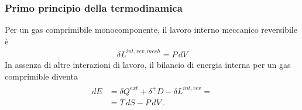 \documentclass[letterpaper,10pt,italian]{jupyterBook}
\begin{document}
\subsubsection{Primo principio della termodinamica}
\label{\detokenize{ch/thermodynamics/ideal-gas-formulas:primo-principio-della-termodinamica}}
\sphinxAtStartPar
Per un gas comprimibile monocomponente, il lavoro interno meccanico reversibile è
\begin{equation*}
\begin{split}\delta L^{int,rev, mech} = P \, d V\end{split}
\end{equation*}
\sphinxAtStartPar
In assenza di altre interazioni di lavoro, il bilancio di energia interna per un gas comprimible diventa
\begin{equation*}
\begin{split}\begin{aligned}
  d E & = \delta Q^{ext} + \delta^+ D - \delta L^{int,rev} = \\
      & = T \, dS - P \, dV \ .
\end{aligned}\end{split}
\end{equation*}
\end{document}
